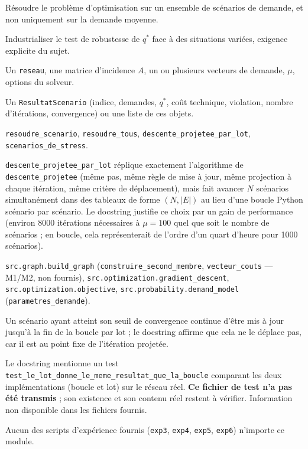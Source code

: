 \documentclass[11pt,a4paper]{article}
\begin{document}
\begin{description}[style=nextline]
  \item[Rôle] Résoudre le problème d'optimisation sur un ensemble de
  scénarios de demande, et non uniquement sur la demande moyenne.
  \item[Objectif] Industrialiser le test de robustesse de $q^*$ face à des
  situations variées, exigence explicite du sujet.
  \item[Entrées] Un \texttt{reseau}, une matrice d'incidence $A$, un ou
  plusieurs vecteurs de demande, $\mu$, options du solveur.
  \item[Sorties] Un \texttt{ResultatScenario} (indice, demandes, $q^*$, coût
  technique, violation, nombre d'itérations, convergence) ou une liste de
  ces objets.
  \item[Principales fonctions] \texttt{resoudre\_scenario},
  \texttt{resoudre\_tous}, \texttt{descente\_projetee\_par\_lot},
  \texttt{scenarios\_de\_stress}.
  \item[Algorithmes] \texttt{descente\_projetee\_par\_lot} réplique
  exactement l'algorithme de \texttt{descente\_projetee} (même pas, même
  règle de mise à jour, même projection à chaque itération, même critère de
  déplacement), mais fait avancer $N$ scénarios simultanément dans des
  tableaux de forme $(N, |E|)$ au lieu d'une boucle Python scénario par
  scénario. Le docstring justifie ce choix par un gain de performance
  (environ 8000 itérations nécessaires à $\mu = 100$ quel que soit le nombre
  de scénarios ; en boucle, cela représenterait de l'ordre d'un quart
  d'heure pour 1000 scénarios).
  \item[Dépendances] \texttt{src.graph.build\_graph}
  (\texttt{construire\_second\_membre}, \texttt{vecteur\_couts} --- M1/M2,
  non fournis), \texttt{src.optimization.gradient\_descent},
  \texttt{src.optimization.objective}, \texttt{src.probability.demand\_model}
  (\texttt{parametres\_demande}).
  \item[Hypothèses] Un scénario ayant atteint son seuil de convergence
  continue d'être mis à jour jusqu'à la fin de la boucle par lot ; le
  docstring affirme que cela ne le déplace pas, car il est au point fixe de
  l'itération projetée.
  \item[Contrôles] Le docstring mentionne un test
  \texttt{test\_le\_lot\_donne\_le\_meme\_resultat\_que\_la\_boucle}
  comparant les deux implémentations (boucle et lot) sur le réseau réel.
  \textbf{Ce fichier de test n'a pas été transmis} ; son existence et son
  contenu réel restent à vérifier. Information non disponible dans les
  fichiers fournis.
  \item[Fichiers qui l'utilisent] Aucun des scripts d'expérience fournis
  (\texttt{exp3}, \texttt{exp4}, \texttt{exp5}, \texttt{exp6}) n'importe ce
  module.
\end{description}
\end{document}
